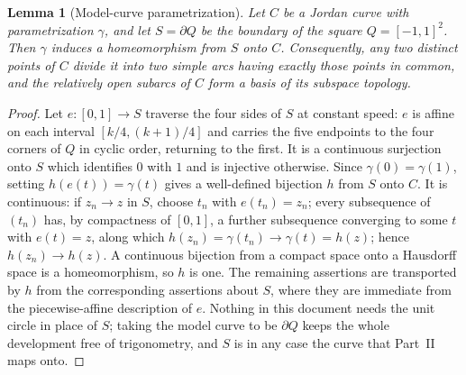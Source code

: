\documentclass[11pt]{article}
\theoremstyle{mainplain}
\newtheorem{lemma}[theorem]{Lemma}
\theoremstyle{mainroman}
\theoremstyle{definition}
\numberwithin{equation}{section}
\begin{document}
\begin{lemma}[Model-curve parametrization]\label{lem:jordan-circle}
Let $C$ be a Jordan curve with parametrization $\gamma$, and let
$S=\partial Q$ be the boundary of the square $Q=[-1,1]^2$. Then $\gamma$
induces a homeomorphism from $S$ onto $C$. Consequently,
any two distinct points of $C$ divide it into two simple arcs having
exactly those points in common, and the relatively open subarcs of $C$
form a basis of its subspace topology.
\end{lemma}
\begin{proof}
Let $e:[0,1]\to S$ traverse the four sides of $S$ at constant speed:
$e$ is affine on each interval $[k/4,(k+1)/4]$ and carries the five
endpoints to the four corners of $Q$ in cyclic order, returning to the
first. It is a continuous surjection onto $S$ which identifies $0$ with
$1$ and is injective otherwise. Since $\gamma(0)=\gamma(1)$, setting
$h(e(t))=\gamma(t)$ gives a well-defined bijection $h$ from $S$ onto
$C$. It is continuous: if $z_n\to z$ in $S$, choose $t_n$ with
$e(t_n)=z_n$; every subsequence of $(t_n)$ has, by compactness of
$[0,1]$, a further subsequence converging to some $t$ with $e(t)=z$,
along which $h(z_n)=\gamma(t_n)\to\gamma(t)=h(z)$; hence
$h(z_n)\to h(z)$. A continuous bijection from a compact space onto a
Hausdorff space is a homeomorphism, so $h$ is one. The remaining
assertions are transported by $h$ from the corresponding assertions
about $S$, where they are immediate from the piecewise-affine
description of $e$. Nothing in this document needs the unit circle in
place of $S$; taking the model curve to be $\partial Q$ keeps the whole
development free of trigonometry, and $S$ is in any case the curve that
Part~II maps onto.
\end{proof}
\end{document}
